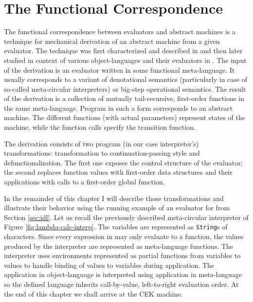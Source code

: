 \chapter{The Functional Correspondence}\label{chapter:functional-correspondence}
The functional correspondence between evaluators and abstract machines is a technique for mechanical derivation of an abstract machine from a given evaluator.
The technique was first characterized and described in \cite{functional-correspondence} and then later studied in context of various object-languages and their evaluators in \cite{ager-interpreter-compiler,ager-call-by-need,pirog-stg,biernacki-logic-engine,biernacka-delimited-continuations,ager-monadic-evaluators,danvy-object-oriented,jedynak-ltac}.
The input of the derivation is an evaluator written in some functional meta-language.
It usually corresponds to a variant of denotational semantics (particularly in case of so-called meta-circular interpreters) or big-step operational semantics.
The result of the derivation is a collection of mutually tail-recursive, first-order functions in the same meta-language.
Program in such a form corresponds to an abstract machine.
The different functions (with actual parameters) represent states of the machine, while the function calls specify the transition function.

The derivation consists of two program (in our case interpreter's) transformations: transformation to continuation-passing style and defunctionalization.
The first one exposes the control structure of the evaluator; the second replaces function values with first-order data structures and their applications with calls to a first-order global function.

In the remainder of this chapter I will describe those transformations and illustrate their behavior using the running example of an evaluator for \LC{} from Section \ref{sec:idl}.
Let us recall the previously described meta-circular interpreter of Figure \ref{fig:lambda-calc-interp}.
The variables are represented as \lstinline!String!s of characters.
Since every expression in \LC{} may only evaluate to a function, the values produced by the interpreter are represented as meta-language functions.
The interpreter uses environments represented as partial functions from variables to values to handle binding of values to variables during application.
The application in object-language is interpreted using application in meta-language so the defined language inherits call-by-value, left-to-right evaluation order.
At the end of this chapter we shall arrive at the CEK machine.


